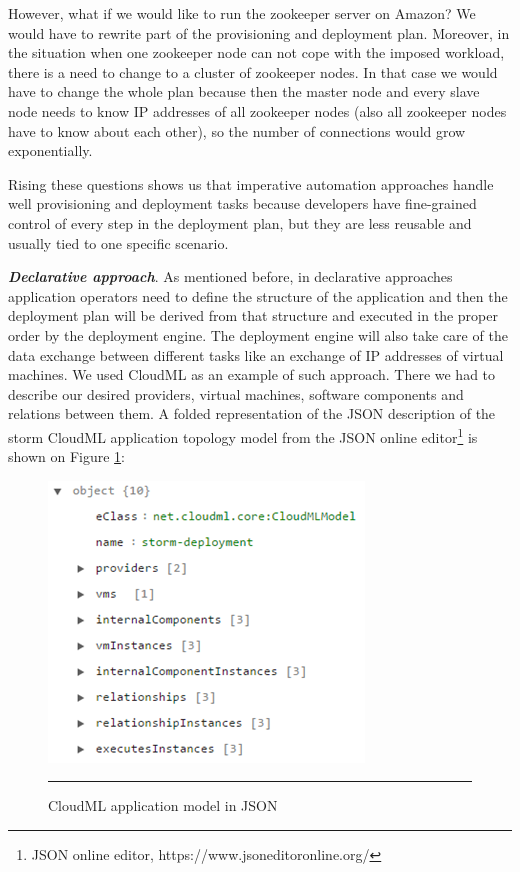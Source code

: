 \noindent However, what if we would like to run the zookeeper server on Amazon? We would have to rewrite part of the provisioning and deployment plan. Moreover, in the situation when one zookeeper node can not cope with the imposed workload, there is a need to change to a cluster of zookeeper nodes. In that case we would have to change the whole plan because then the master node and every slave node needs to know IP addresses of all zookeeper nodes (also all zookeeper nodes have to know about each other), so the number of connections would grow exponentially. 

\noindent


\noindent Rising these questions shows us that imperative automation approaches handle well provisioning and deployment tasks because developers have fine-grained control of every step in the deployment plan, but they are less reusable and usually tied to one specific scenario.

\noindent 

\noindent \textbf{\textit{Declarative approach}}. As mentioned before, in declarative approaches application operators need to define the structure of the application and then the deployment plan will be derived from that structure and executed in the proper order by the deployment engine. The deployment engine will also take care of the data exchange between different tasks like an exchange of IP addresses of virtual machines. We used CloudML \cite{FerrySongRCS14} as an example of such approach. There we had to describe our desired providers, virtual machines, software components and relations between them. A folded representation of the JSON description of the storm CloudML application topology model from the JSON online editor\footnote{ JSON online editor, https://www.jsoneditoronline.org/} is shown on Figure \ref{fig:JSON}:

\noindent

\begin{figure}[htbp]
	\centering
		\includegraphics{./Figures/Declarative}
		\rule{38em}{0.5pt}
	\caption[Declarative Approach]{CloudML application model in JSON}
	\label{fig:JSON}
\end{figure}

